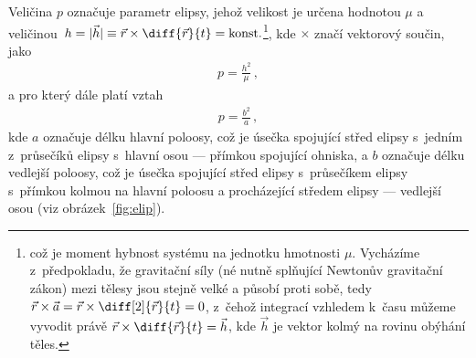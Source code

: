\documentclass[A4paper, 12pt, oneside]{book}
\begin{document}
Veličina $p$ označuje parametr elipsy, jehož velikost je určena hodnotou $\mu$ a veličinou~$h=|\vec{h}| \equiv \vec{r}\times\diff{\vec{r}}{t}={\rm konst.}$\footnote{což je  moment hybnost systému na jednotku hmotnosti $\mu$. Vycházíme z~předpokladu, že gravitační síly (né nutně splňující Newtonův gravitační zákon) mezi tělesy jsou stejně velké a působí proti sobě, tedy $\vec{r}\times\vec{a}=\vec{r}\times\diff[2]{\vec{r}}{t}=0$, z~čehož integrací vzhledem k~času můžeme vyvodit právě $\vec{r}\times\diff{\vec{r}}{t}=\vec{h}$, kde $\vec{h}$ je vektor kolmý na rovinu obýhání těles.}, kde $\times$ značí vektorový součin, jako
\begin{align}
	p=\frac{h^2}{\mu}\,,
\end{align}
a pro který dále platí vztah
\begin{align}
	p=\frac{b^2}{a}\,,
\end{align}
kde $a$ označuje délku hlavní poloosy, což je úsečka spojující střed elipsy s~jedním z~průsečíků elipsy s~hlavní osou --- přímkou spojující ohniska, a $b$ označuje délku vedlejší poloosy, což je úsečka spojující střed elipsy s~průsečíkem elipsy s~přímkou kolmou na hlavní poloosu a procházející středem elipsy --- vedlejší osou (viz obrázek~\ref{fig:elip}).
\end{document}
